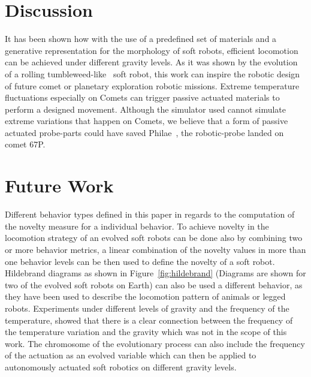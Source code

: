 \documentclass{sig-alternate}
\begin{document}
\section{Discussion}
It has been shown how with the use of a predefined set of materials and a generative representation for the morphology of soft robots, efficient locomotion can be achieved under different gravity levels. As it was shown by the evolution of a rolling tumbleweed-like~\cite{antol2003low} soft robot, this work can inspire the robotic design of future comet or planetary exploration robotic missions. Extreme temperature fluctuations especially on Comets can trigger passive actuated materials to perform a designed movement. Although the simulator used cannot simulate extreme variations that happen on Comets, we believe that a form of passive actuated probe-parts could have saved Philae~\cite{glassmeier2007rosetta}, the robotic-probe landed on comet 67P.


\section{Future Work}
Different behavior types defined in this paper in regards to the computation of the novelty measure for a individual behavior. To achieve novelty in the locomotion strategy of an evolved soft robots can be done also by combining two or more behavior metrics, a linear combination of the novelty values in more than one behavior levels can be then used to define the novelty of a soft robot. Hildebrand diagrams as shown in Figure~\ref{fig:hildebrand} (Diagrams are shown for two of the evolved soft robots on Earth) can also be used a different behavior, as they have been used to describe the locomotion pattern of animals or legged robots. Experiments under different levels of gravity and the frequency of the temperature, showed that there is a clear connection between the frequency of the temperature variation and the gravity which was not in the scope of this work. The chromosome of the evolutionary process can also include the frequency of the actuation as an evolved variable which can then be applied to autonomously actuated soft robotics on different gravity levels.
\end{document}
